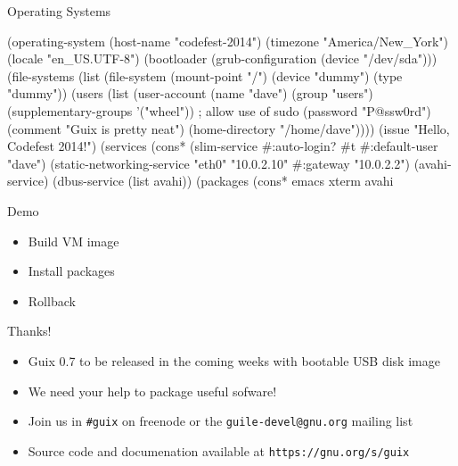 \documentclass{beamer}
\begin{document}
\begin{frame}[fragile]{Operating Systems}
  \scriptsize{\begin{semiverbatim}
(operating-system
 (host-name "codefest-2014")
 (timezone "America/New_York")
 (locale "en_US.UTF-8")
 (bootloader (grub-configuration (device "/dev/sda")))
 (file-systems
  (list (file-system (mount-point "/") (device "dummy") (type "dummy"))
 (users (list (user-account
               (name "dave")
               (group "users")
               (supplementary-groups '("wheel"))  ; allow use of sudo
               (password "P@ssw0rd")
               (comment "Guix is pretty neat")
               (home-directory "/home/dave"))))
 (issue "Hello, Codefest 2014!")
 (services (cons* (slim-service #:auto-login? #t #:default-user "dave")
                  (static-networking-service "eth0" "10.0.2.10"
                                             #:gateway "10.0.2.2")
                  (avahi-service)
                  (dbus-service (list avahi))
 (packages (cons* emacs xterm avahi %
  \end{semiverbatim}}
\end{frame}

\begin{frame}{Demo}
  \begin{itemize}
  \item Build VM image
  \item Install packages
  \item Rollback
  \end{itemize}
\end{frame}

\begin{frame}{Thanks!}
  \begin{itemize}
  \item Guix 0.7 to be released in the coming weeks with bootable USB
    disk image
  \item We need your help to package useful sofware!
  \item Join us in \texttt{\#guix} on freenode or
    the \texttt{guile-devel@gnu.org} mailing list
  \item Source code and documenation available at
    \texttt{https://gnu.org/s/guix}
  \end{itemize}
\end{frame}
\end{document}
